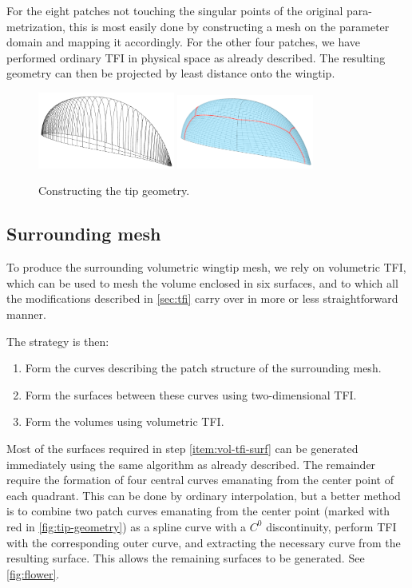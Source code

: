 \documentclass[3p,times,procedia]{elsarticle}
\begin{document}
For the eight patches not touching the singular points of the original
para-metrization, this is most easily done by constructing a mesh on the
parameter domain and mapping it accordingly. For the other four patches, we have
performed ordinary TFI in physical space as already described. The resulting
geometry can then be projected by least distance onto the wingtip.

\begin{figure}
  \centering
    \includegraphics[width=0.4\textwidth]{figs/wingtip-skeleton}
    \includegraphics[width=0.4\textwidth]{figs/wingtip-full}
    \caption{Constructing the tip geometry.}
    \label{fig:tip-geometry}
\end{figure}

\subsection{Surrounding mesh}

To produce the surrounding volumetric wingtip mesh, we rely on volumetric TFI,
which can be used to mesh the volume enclosed in six surfaces, and to which all
the modifications described in \autoref{sec:tfi} carry over in more or less
straightforward manner.

The strategy is then:
\begin{enumerate}
\item Form the curves describing the patch structure of the surrounding mesh.
\item Form the surfaces between these curves using two-dimensional
  TFI. \label{item:vol-tfi-surf}
\item Form the volumes using volumetric TFI.
\end{enumerate}

Most of the surfaces required in step \ref{item:vol-tfi-surf} can be generated
immediately using the same algorithm as already described. The remainder require
the formation of four central curves emanating from the center point of each
quadrant. This can be done by ordinary interpolation, but a better method is to
combine two patch curves emanating from the center point (marked with red in
\autoref{fig:tip-geometry}) as a spline curve with a $C^0$ discontinuity,
perform TFI with the corresponding outer curve, and extracting the necessary
curve from the resulting surface. This allows the remaining surfaces to be
generated. See \autoref{fig:flower}.
\end{document}

